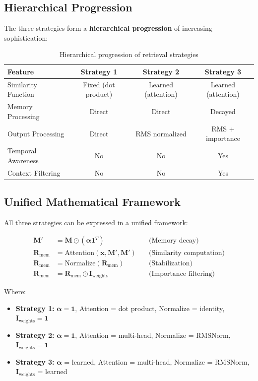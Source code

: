 \documentclass{article}
\begin{document}
\subsection{Hierarchical Progression}

The three strategies form a \textbf{hierarchical progression} of increasing sophistication:

\begin{table}[h]
\centering
\begin{tabular}{|l|c|c|c|}
\hline
\textbf{Feature} & \textbf{Strategy 1} & \textbf{Strategy 2} & \textbf{Strategy 3} \\
\hline
Similarity Function & Fixed (dot product) & Learned (attention) & Learned (attention) \\
Memory Processing & Direct & Direct & Decayed \\
Output Processing & Direct & RMS normalized & RMS + importance \\
Temporal Awareness & No & No & Yes \\
Context Filtering & No & No & Yes \\
\hline
\end{tabular}
\caption{Hierarchical progression of retrieval strategies}
\end{table}

\subsection{Unified Mathematical Framework}

All three strategies can be expressed in a unified framework:

\begin{align}
\mathbf{M}' &= \mathbf{M} \odot (\boldsymbol{\alpha} \mathbf{1}^T) \quad &\text{(Memory decay)} \\
\mathbf{R}_{\text{mem}} &= \text{Attention}(\mathbf{x}, \mathbf{M}', \mathbf{M}') \quad &\text{(Similarity computation)} \\
\mathbf{R}_{\text{mem}} &= \text{Normalize}(\mathbf{R}_{\text{mem}}) \quad &\text{(Stabilization)} \\
\mathbf{R}_{\text{mem}} &= \mathbf{R}_{\text{mem}} \odot \mathbf{I}_{\text{weights}} \quad &\text{(Importance filtering)}
\end{align}

Where:
\begin{itemize}
\item \textbf{Strategy 1:} $\boldsymbol{\alpha} = \mathbf{1}$, Attention = dot product, Normalize = identity, $\mathbf{I}_{\text{weights}} = \mathbf{1}$
\item \textbf{Strategy 2:} $\boldsymbol{\alpha} = \mathbf{1}$, Attention = multi-head, Normalize = RMSNorm, $\mathbf{I}_{\text{weights}} = \mathbf{1}$
\item \textbf{Strategy 3:} $\boldsymbol{\alpha}$ = learned, Attention = multi-head, Normalize = RMSNorm, $\mathbf{I}_{\text{weights}}$ = learned
\end{itemize}
\end{document}
